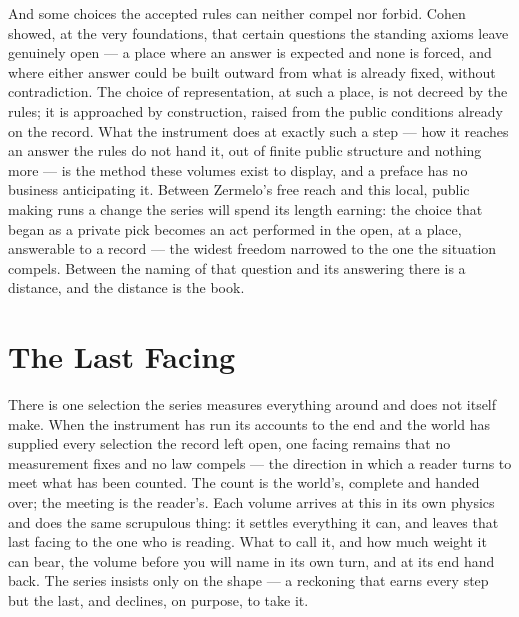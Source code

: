 And some choices the accepted rules can neither compel nor forbid. Cohen showed, at the very foundations, that
certain questions the standing axioms leave genuinely open --- a place where an answer is expected and none is
forced, and where either answer could be built outward from what is already fixed, without contradiction. The
choice of representation, at such a place, is not decreed by the rules; it is approached by construction, raised
from the public conditions already on the record. What the instrument does at exactly such a step --- how it
reaches an answer the rules do not hand it, out of finite public structure and nothing more --- is the method
these volumes exist to display, and a preface has no business anticipating it. Between Zermelo's free reach and
this local, public making runs a change the series will spend its length earning: the choice that began as a
private pick becomes an act performed in the open, at a place, answerable to a record --- the widest freedom
narrowed to the one the situation compels. Between the naming of that question and its answering there is a
distance, and the distance is the book.

\section*{The Last Facing}

There is one selection the series measures everything around and does not itself make. When the instrument has
run its accounts to the end and the world has supplied every selection the record left open, one facing remains
that no measurement fixes and no law compels --- the direction in which a reader turns to meet what has been
counted. The count is the world's, complete and handed over; the meeting is the reader's. Each volume arrives at
this in its own physics and does the same scrupulous thing: it settles everything it can, and leaves that last
facing to the one who is reading. What to call it, and how much weight it can bear, the volume before you will
name in its own turn, and at its end hand back. The series insists only on the shape --- a reckoning that earns
every step but the last, and declines, on purpose, to take it.

